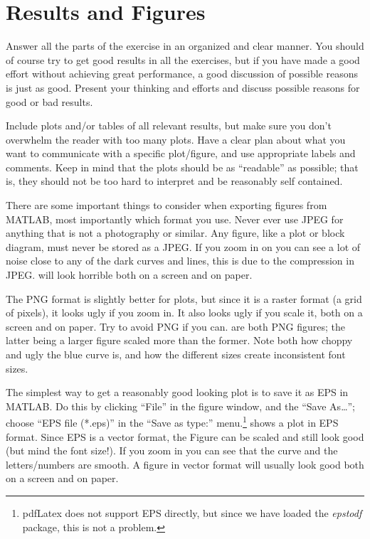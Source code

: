 \section{Results and Figures}\label{sec:figures}
Answer all the parts of the exercise in an organized and clear manner. You should of course try to get good results in all the exercises, but if you have made a good effort without achieving great performance, a good discussion of possible reasons is just as good. Present your thinking and efforts and discuss possible reasons for good or bad results.

Include plots and/or tables of all relevant results, but make sure you don't overwhelm the reader with too many plots. Have a clear plan about what you want to communicate with a specific plot/figure, and use appropriate labels and comments. Keep in mind that the plots should be as ``readable'' as possible; that is, they should not be too hard to interpret and be reasonably self contained.

There are some important things to consider when exporting figures from MATLAB, most importantly which format you use. Never ever use JPEG for anything that is not a photography or similar. Any figure, like a plot or block diagram, must never be stored as a JPEG\@. If you zoom in on  you can see a lot of noise close to any of the dark curves and lines, this is due to the compression in JPEG\@.  will look horrible both on a screen and on paper.

The PNG format is slightly better for plots, but since it is a raster format (a grid of pixels), it looks ugly if you zoom in. It also looks ugly if you scale it, both on a screen and on paper. Try to avoid PNG if you can.  are both PNG figures; the latter being a larger figure scaled more than the former. Note both how choppy and ugly the blue curve is, and how the different sizes create inconsistent font sizes.

The simplest way to get a reasonably good looking plot is to save it as EPS in MATLAB\@. Do this by clicking ``File'' in the figure window, and the ``Save As\ldots''; choose ``EPS file (*.eps)'' in the ``Save as type:'' menu.\footnote{pdfLatex does not support EPS directly, but since we have loaded the \emph{epstodf} package, this is not a problem.}  shows a plot in EPS format. Since EPS is a vector format, the Figure can be scaled and still look good (but mind the font size!). If you zoom in you can see that the curve and the letters/numbers are smooth. A figure in vector format will usually look good both on a screen and on paper.

